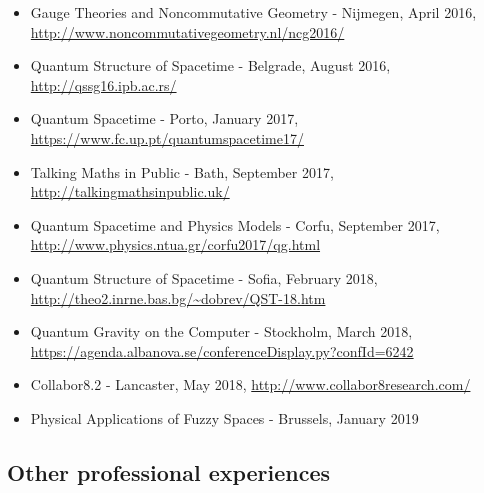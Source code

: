 \documentclass[10pt]{article}
\providecommand{\tightlist}{%
  \setlength{\itemsep}{0pt}\setlength{\parskip}{0pt}}
\begin{document}
\begin{itemize}
\tightlist
\item
  Gauge Theories and Noncommutative Geometry - Nijmegen, April 2016,
  \url{http://www.noncommutativegeometry.nl/ncg2016/}
\item
  Quantum Structure of Spacetime - Belgrade, August 2016,
  \url{http://qssg16.ipb.ac.rs/}
\item
  Quantum Spacetime - Porto, January 2017,
  \url{https://www.fc.up.pt/quantumspacetime17/}
\item
  Talking Maths in Public - Bath, September 2017,
  \url{http://talkingmathsinpublic.uk/}
\item
  Quantum Spacetime and Physics Models - Corfu, September 2017,
  \url{http://www.physics.ntua.gr/corfu2017/qg.html}
\item
  Quantum Structure of Spacetime - Sofia, February 2018,
  \url{http://theo2.inrne.bas.bg/~dobrev/QST-18.htm}
\item
  Quantum Gravity on the Computer - Stockholm, March 2018,
  \url{https://agenda.albanova.se/conferenceDisplay.py?confId=6242}
\item
  Collabor8.2 - Lancaster, May 2018,
  \url{http://www.collabor8research.com/}
\item
  Physical Applications of Fuzzy Spaces - Brussels, January 2019
\end{itemize}

\subsection{Other professional
experiences}\label{other-professional-experiences}
\end{document}
